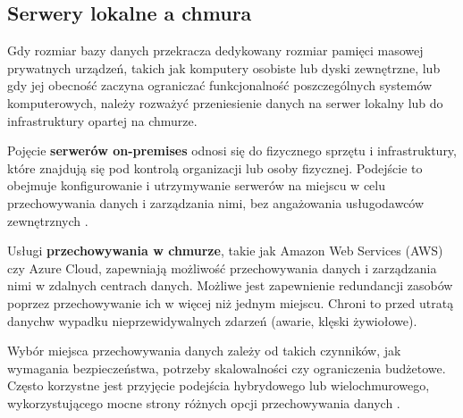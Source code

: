 \documentclass[12pt,a4paper,twoside]{article}
\begin{document}
\subsection*{Serwery lokalne a chmura}
Gdy rozmiar bazy danych przekracza dedykowany rozmiar pamięci masowej prywatnych urządzeń, takich jak komputery osobiste lub dyski zewnętrzne, lub gdy jej obecność zaczyna ograniczać funkcjonalność poszczególnych systemów komputerowych, należy rozważyć przeniesienie danych na serwer lokalny lub do infrastruktury opartej na chmurze.\par
Pojęcie \textbf{serwerów on-premises} odnosi się do fizycznego sprzętu i infrastruktury, które znajdują się pod kontrolą organizacji lub osoby fizycznej. Podejście to obejmuje konfigurowanie i utrzymywanie serwerów na miejscu w celu przechowywania danych i zarządzania nimi, bez angażowania usługodawców zewnętrznych \cite{F2023}.\par
Usługi \textbf{przechowywania w chmurze}, takie jak Amazon Web Services (AWS) czy Azure Cloud, zapewniają możliwość przechowywania danych i zarządzania nimi w zdalnych centrach danych. Możliwe jest zapewnienie redundancji zasobów poprzez przechowywanie ich w więcej niż jednym miejscu. Chroni to przed utratą danych\break w wypadku nieprzewidywalnych zdarzeń (awarie, klęski żywiołowe).\par
Wybór miejsca przechowywania danych zależy od takich czynników, jak wymagania bezpieczeństwa, potrzeby skalowalności czy ograniczenia budżetowe. Często korzystne jest przyjęcie podejścia hybrydowego lub wielochmurowego, wykorzystującego mocne strony różnych opcji przechowywania danych \cite{Ho2022}.\par
\end{document}
